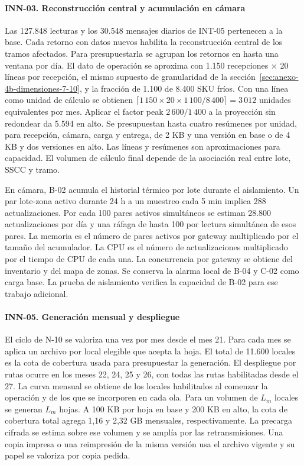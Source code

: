\paragraph{INN-03. Reconstrucción central y acumulación en cámara}
Las 127.848 lecturas y los 30.548 mensajes diarios de INT-05 pertenecen a la base. Cada retorno con datos nuevos habilita la reconstrucción central de los tramos afectados. Para presupuestarla se agrupan los retornos en hasta una ventana por día. El dato de operación se aproxima con 1.150 recepciones × 20 líneas por recepción, el mismo supuesto de granularidad de la sección~\ref{sec:anexo-4b-dimensiones-7-10}, y la fracción de 1.100 de 8.400 SKU fríos. Con una línea como unidad de cálculo se obtienen $\lceil 1\,150\times20\times1\,100/8\,400\rceil=3\,012$ unidades equivalentes por mes. Aplicar el factor peak $2\,600/1\,400$ a la proyección sin redondear da 5.594 en alto. Se presupuestan hasta cuatro resúmenes por unidad, para recepción, cámara, carga y entrega, de 2 KB y una versión en base o de 4 KB y dos versiones en alto. Las líneas y resúmenes son aproximaciones para capacidad. El volumen de cálculo final depende de la asociación real entre lote, SSCC y tramo.

En cámara, B-02 acumula el historial térmico por lote durante el aislamiento. Un par lote-zona activo durante 24 h a un muestreo cada 5 min implica 288 actualizaciones. Por cada 100 pares activos simultáneos se estiman 28.800 actualizaciones por día y una ráfaga de hasta 100 por lectura simultánea de esos pares. La memoria es el número de pares activos por gateway multiplicado por el tamaño del acumulador. La CPU es el número de actualizaciones multiplicado por el tiempo de CPU de cada una. La concurrencia por gateway se obtiene del inventario y del mapa de zonas. Se conserva la alarma local de B-04 y C-02 como carga base. La prueba de aislamiento verifica la capacidad de B-02 para ese trabajo adicional.

\paragraph{INN-05. Generación mensual y despliegue}
El ciclo de N-10 se valoriza una vez por mes desde el mes 21. Para cada mes se aplica un archivo por local elegible que acepta la hoja. El total de 11.600 locales es la cota de cobertura usada para presupuestar la generación. El despliegue por rutas ocurre en los meses 22, 24, 25 y 26, con todas las rutas habilitadas desde el 27. La curva mensual se obtiene de los locales habilitados al comenzar la operación y de los que se incorporen en cada ola. Para un volumen de $L_m$ locales se generan $L_m$ hojas. A 100 KB por hoja en base y 200 KB en alto, la cota de cobertura total agrega 1,16 y 2,32 GB mensuales, respectivamente. La precarga cifrada se estima sobre ese volumen y se amplía por las retransmisiones. Una copia impresa o una reimpresión de la misma versión usa el archivo vigente y su papel se valoriza por copia pedida.

